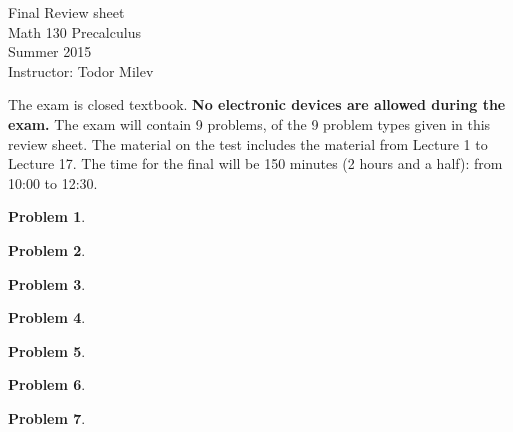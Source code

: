 \documentclass{article}
\newtheorem{problem}{Problem}
\begin{document}
\begin{center}
\Large
Final Review sheet \\ Math 130 Precalculus \\ \normalsize Summer 2015 \\ Instructor: Todor Milev
\end{center}



\noindent The exam is closed textbook. \textbf{No electronic devices are allowed during the exam. } The exam will contain 9 problems, of the 9 problem types given in this review sheet. The material on the test includes the material from Lecture 1 to Lecture 17. The time for the final will be 150  minutes (2 hours and a half): from 10:00 to 12:30. %

\begin{problem}

\end{problem}

\begin{problem}

\end{problem}
\begin{problem}

\end{problem}


\begin{problem}

\end{problem}



\begin{problem}

\end{problem}

\begin{problem}

\end{problem}

\begin{problem}

\end{problem}
\end{document}
